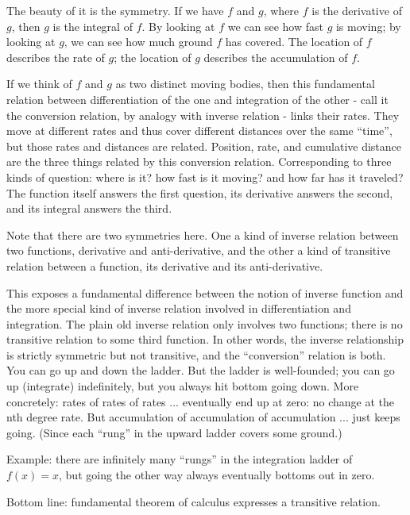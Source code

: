 \begin{remark}
  The beauty of it is the symmetry.  If we have \(f\) and \(g\), where
  \(f\) is the derivative of \(g\), then \(g\) is the integral of
  \(f\).  By looking at \(f\) we can see how fast \(g\) is moving; by
  looking at \(g\), we can see how much ground \(f\) has covered.  The
  location of \(f\) describes the rate of \(g\); the location of \(g\)
  describes the accumulation of \(f\).

  If we think of \(f\) and \(g\) as two distinct moving bodies, then
  this fundamental relation between differentiation of the one and
  integration of the other - call it the conversion relation, by
  analogy with inverse relation - links their rates.  They move at
  different rates and thus cover different distances over the same
  ``time'', but those rates and distances are related.  Position,
  rate, and cumulative distance are the three things related by this
  conversion relation.  Corresponding to three kinds of question:
  where is it? how fast is it moving? and how far has it traveled?
  The function itself answers the first question, its derivative
  answers the second, and its integral answers the third.

  Note that there are two symmetries here.  One a kind of inverse
  relation between two functions, derivative and anti-derivative, and
  the other a kind of transitive relation between a function, its
  derivative and its anti-derivative.

  This exposes a fundamental difference between the notion of inverse
  function and the more special kind of inverse relation involved in
  differentiation and integration.  The plain old inverse relation
  only involves two functions; there is no transitive relation to some
  third function.  In other words, the inverse relationship is
  strictly symmetric but not transitive, and the ``conversion''
  relation is both.  You can go up and down the ladder.  But the
  ladder is well-founded; you can go up (integrate) indefinitely, but
  you always hit bottom going down.  More concretely: rates of rates
  of rates ... eventually end up at zero: no change at the nth degree
  rate.  But accumulation of accumulation of accumulation ... just
  keeps going.  (Since each ``rung'' in the upward ladder covers some
  ground.)

  Example: there are infinitely many ``rungs'' in the integration
  ladder of \(f(x)=x\), but going the other way always eventually
  bottoms out in zero.

  Bottom line: fundamental theorem of calculus expresses a transitive
  relation.


\end{remark}
